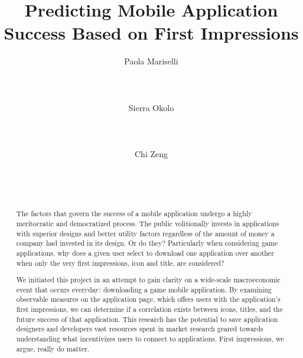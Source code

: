\documentclass{sigchi}
\begin{document}
\title{Predicting Mobile Application Success Based on First Impressions}

\author{
  \alignauthor Paola Mariselli\\
    \\
    \\
    \\
  \alignauthor Sierra Okolo\\
    \\
    \\
    \\
  \alignauthor Chi Zeng\\
    \\
    \\
    \\
}

\maketitle
\begin{abstract}
The factors that govern the success of a mobile application undergo a highly meritocratic and democratized process. The public volitionally invests in applications with superior designs and better utility factors regardless of the amount of money a company had invested in its design. Or do they? Particularly when considering game applications, why does a given user select to download one application over another when only the very first impressions, icon and title, are considered?

We initiated this project in an attempt to gain clarity on a wide-scale macroeconomic event that occurs everyday: downloading a game mobile application. By examining observable measures on the application page, which offers users with the application's first impressions, we can determine if a correlation exists between icons, titles, and the future success of that application. This research has the potential to save application designers and developers vast resources spent in market research geared towards understanding what incentivizes users to connect to applications. First impressions, we argue, really do matter.
\end{abstract}











\end{document}
